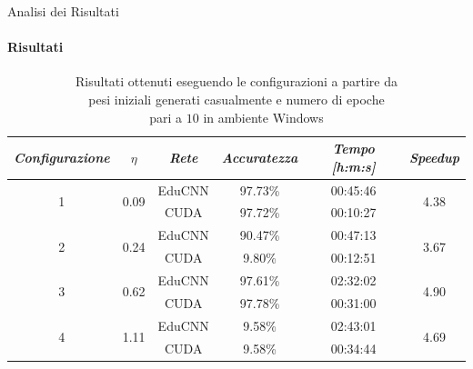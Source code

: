 \documentclass[
 ]{beamer}
\begin{document}
\begin{frame}{Analisi dei Risultati}
    \framesubtitle{Risultati}

        \begin{table}
            \centering
            \renewcommand\arraystretch{1.3}
            \small
            \begin{tabular}{| c | c | c | c | c | c |}
                \hline
                \emph{Configurazione} & $\eta$ & \emph{Rete} & \emph{Accuratezza} & \emph{Tempo [h:m:s]} & \emph{Speedup} \\
                \hline
                \multirow{2}{*}{1} & \multirow{2}{*}{0.09} & EduCNN & 97.73\% & 00:45:46 & \multirow{2}{*}{4.38} \\ \cline{3-5} 
                                   &                       & CUDA   & 97.72\% & 00:10:27  & \\
                \hline
                \multirow{2}{*}{2} & \multirow{2}{*}{0.24} & EduCNN & 90.47\% & 00:47:13 & \multirow{2}{*}{3.67} \\ \cline{3-5} 
                                   &                       & CUDA   & 9.80\% & 00:12:51 & \\
                \hline
                \multirow{2}{*}{3} & \multirow{2}{*}{0.62} & EduCNN & 97.61\% & 02:32:02 & \multirow{2}{*}{4.90} \\ \cline{3-5} 
                                   &                       & CUDA   & 97.78\% & 00:31:00 & \\
                \hline
                \multirow{2}{*}{4} & \multirow{2}{*}{1.11} & EduCNN & 9.58\% & 02:43:01 & \multirow{2}{*}{4.69} \\ \cline{3-5} 
                                   &                       & CUDA   & 9.58\% & 00:34:44 & \\
                \hline
            \end{tabular}
            \caption            
    {Risultati ottenuti eseguendo le configurazioni a partire da \\ pesi iniziali generati casualmente e numero di epoche \\ pari a $10$ in ambiente Windows \endtabular}          
        \end{table}    
\end{frame}



\end{document}
